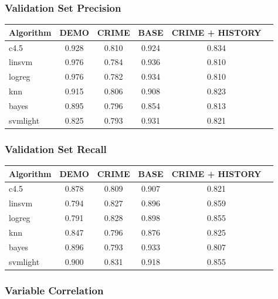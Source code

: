 \documentclass[11pt,letter]{article}
\begin{document}
\subsubsection{Validation Set Precision}

\begin{tabular}{|l|c|c|c|c|c|}
\hline
Algorithm & DEMO & CRIME & BASE & CRIME + HISTORY\\
\hline
c4.5     & 0.928 & 0.810 & 0.924 & 0.834 \\
linsvm   & 0.976 & 0.784 & 0.936 & 0.810 \\
logreg   & 0.976 & 0.782 & 0.934 & 0.810 \\
knn   & 0.915 & 0.806 & 0.908 & 0.823 \\
bayes    & 0.895 & 0.796 & 0.854 & 0.813 \\
svmlight & 0.825 & 0.793 & 0.931 & 0.821 \\
\hline
\end{tabular}

\subsubsection{Validation Set Recall}

\begin{tabular}{|l|c|c|c|c|c|}
\hline
Algorithm & DEMO & CRIME & BASE & CRIME + HISTORY\\
\hline
c4.5     & 0.878 & 0.809 & 0.907 & 0.821 \\
linsvm   & 0.794 & 0.827 & 0.896 & 0.859 \\
logreg   & 0.791 & 0.828 & 0.898 & 0.855 \\
knn   & 0.847 & 0.796 & 0.876 & 0.825 \\
bayes    & 0.896 & 0.793 & 0.933 & 0.807 \\
svmlight & 0.900 & 0.831 & 0.918 & 0.855 \\
\hline
\end{tabular}

\subsubsection{Variable Correlation}
\end{document}
